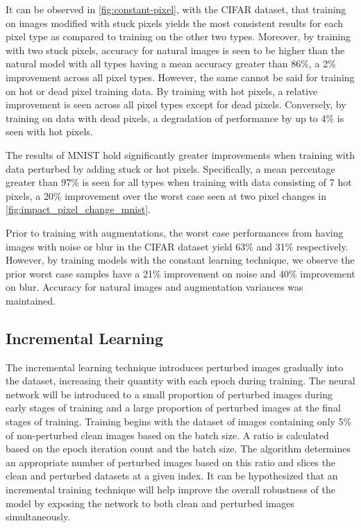 \documentclass[conference]{IEEEtran}
\begin{document}
It can be observed in \autoref{fig:constant-pixel}, with the CIFAR dataset, that training on images modified with stuck pixels yields the most consistent results for each pixel type as compared to training on the other two types. Moreover, by training with two stuck pixels, accuracy for natural images is seen to be higher than the natural model with all types having a mean accuracy greater than 86\%, a 2\% improvement across all pixel types. However, the same cannot be said for training on hot or dead pixel training data. By training with hot pixels, a relative improvement is seen across all pixel types except for dead pixels. Conversely, by training on data with dead pixels, a degradation of performance by up to 4\% is seen with hot pixels. 

The results of MNIST hold significantly greater improvements when training with data perturbed by adding stuck or hot pixels. Specifically, a mean percentage greater than 97\% is seen for all types when training with data consisting of 7 hot pixels, a 20\% improvement over the worst case seen at two pixel changes in \autoref{fig:impact_pixel_change_mnist}. 

Prior to training with augmentations, the worst case performances from having images with noise or blur in the CIFAR dataset yield 63\% and 31\% respectively. However, by training models with the constant learning technique, we observe the prior worst case samples have a 21\% improvement on noise and 40\% improvement on blur. Accuracy for natural images and augmentation variances was maintained.

\subsection{Incremental Learning}

The incremental learning technique introduces perturbed images gradually into the dataset, increasing their quantity with each epoch during training. The neural network will be introduced to a small proportion of perturbed images during early stages of training and a large proportion of perturbed images at the final stages of training. Training begins with the dataset of images containing only 5\% of non-perturbed clean images based on the batch size. A ratio is calculated based on the epoch iteration count and the batch size. The algorithm determines an appropriate number of perturbed images based on this ratio and slices the clean and perturbed datasets at a given index. It can be hypothesized that an incremental training technique will help improve the overall robustness of the model by exposing the network to both clean and perturbed images simultaneously.
\end{document}
